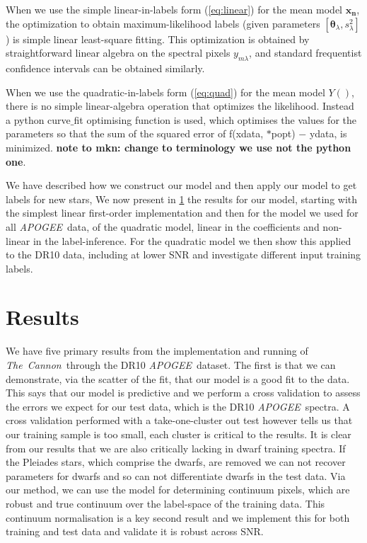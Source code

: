 \documentclass[12pt, preprint]{aastex}
\newcommand{\set}[1]{\bm{#1}}
\newcommand{\tc}{\textsl{The~Cannon}}
\newcommand{\apogee}{\textsl{APOGEE}}
\begin{document}
When we use the simple linear-in-labels form (\ref{eq:linear}) for the
mean model $\set{x_n}$, the optimization to obtain maximum-likelihood labels
(given parameters $[\set{\theta}_\lambda, s_\lambda^2]$) is simple linear
least-square fitting.
This optimization is obtained by straightforward linear algebra on the
spectral pixels $y_{m\lambda}$, and standard frequentist confidence
intervals can be obtained similarly.

When we use the quadratic-in-labels form (\ref{eq:quad}) for the
mean model $Y()$, there is no simple linear-algebra operation that
optimizes the likelihood. Instead a python curve$\_$fit optimising function is used, which optimises the values for the parameters so that the sum of the squared error of f(xdata, $*$popt) $-$ ydata,  is minimized. \textbf{note to mkn: change to terminology we use not the python one}.

We have described how we construct our model and then apply our model to get labels for new stars, We now present in \ref{sec:results} the results for our model, starting with the simplest linear first-order implementation and then for the model we used for all \apogee\ data, of the quadratic model, linear in the coefficients and non-linear in the label-inference.  For the quadratic model we then show this applied to the DR10 data, including at lower SNR and investigate different input training labels. 



\section{Results}
\label{sec:results}

We have five primary results from the implementation and running of \tc\ through the DR10 \apogee\ dataset. The first is that we can demonstrate, via the scatter of the fit, that our model is a good fit to the data. This says that our model is predictive and we perform a cross validation to assess the errors we expect for our test data, which is the DR10 \apogee\ spectra. A cross validation performed with a take-one-cluster out test however tells us that our training sample is too small, each cluster is critical to the results. It is clear from our results that we are also critically lacking in dwarf training spectra. If the Pleiades stars, which comprise the dwarfs, are removed we can not recover parameters for dwarfs and so can not differentiate dwarfs in the test data.
Via our method, we can use the model for determining continuum pixels, which are robust and true continuum over the label-space of the training data. This continuum normalisation is a key second result and we implement this for both training and test data and validate it is robust across SNR. 
\end{document}
